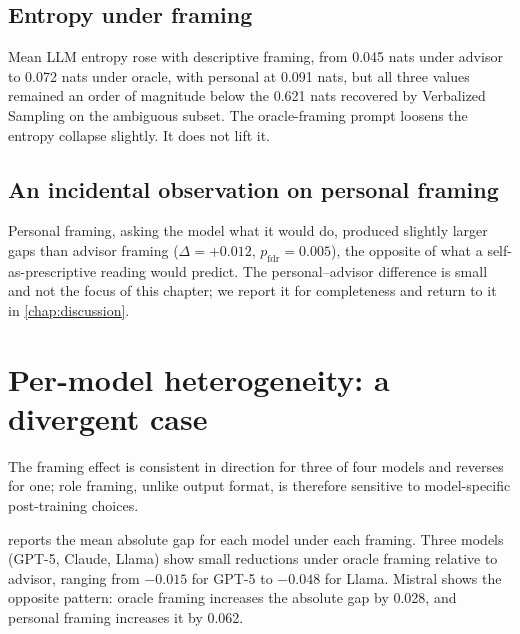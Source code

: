 \subsection*{Entropy under framing}

Mean LLM entropy rose with descriptive framing, from 0.045 nats under
advisor to 0.072 nats under oracle, with personal at 0.091 nats, but
all three values remained an order of magnitude below the 0.621 nats
recovered by Verbalized Sampling on the ambiguous subset. The
oracle-framing prompt loosens the entropy collapse slightly. It does
not lift it.

\subsection*{An incidental observation on personal framing}

Personal framing, asking the model what it would do, produced
slightly larger gaps than advisor framing ($\Delta = +0.012$,
$p_\text{fdr} = 0.005$), the opposite of what a self-as-prescriptive
reading would predict. The personal--advisor difference is small and
not the focus of this chapter; we report it for completeness and
return to it in \cref{chap:discussion}.

\section{Per-model heterogeneity: a divergent case}
\label{sec:d2_models}

The framing effect is consistent in direction for three of four models
and reverses for one; role framing, unlike output format, is therefore
sensitive to model-specific post-training choices.

 reports the mean absolute gap for each model
under each framing. Three models (GPT-5, Claude, Llama) show small
reductions under oracle framing relative to advisor, ranging from
$-0.015$ for GPT-5 to $-0.048$ for Llama. Mistral shows the opposite
pattern: oracle framing increases the absolute gap by 0.028, and
personal framing increases it by 0.062.


